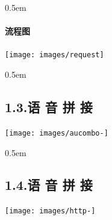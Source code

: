 \documentclass{article}
\begin{document}
\begin{mdbmargintb}{}{0.5em}%
\paragraph{{流程图}}\label{section}%
\end{mdbmargintb}%

\begin{mdcenter}%

\noindent{}\texttt{[image: images/request]}{}%
\end{mdcenter}%

\noindent{}%

\begin{mdbmargintb}{}{0.5em}%
\subsection{{1.3.\hspace*{0.5em}语 音 拼 接}}\label{sec--}%
\end{mdbmargintb}%

\begin{mdcenter}%

\noindent{}\texttt{[image: images/aucombo-]}{}%
\end{mdcenter}%

\begin{mdbmargintb}{}{0.5em}%
\subsection{{1.4.\hspace*{0.5em}语 音 拼 接}}\label{sec--}%
\end{mdbmargintb}%

\noindent{}%

\begin{mdcenter}%

\noindent{}\texttt{[image: images/http-]}{}%
\end{mdcenter}%
\end{document}
